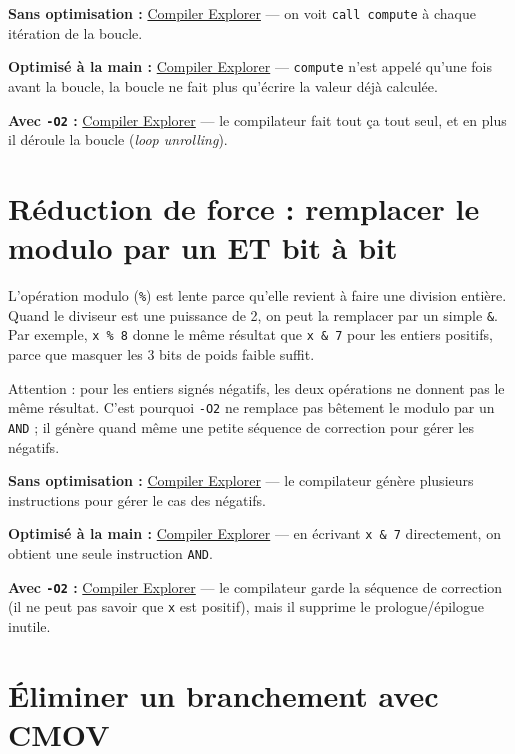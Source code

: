 \documentclass[a4paper,12pt]{article}
\begin{document}
\textbf{Sans optimisation :} \href{https://godbolt.org/z/rs34zxv66}{Compiler Explorer}
--- on voit \texttt{call compute} à chaque itération de la boucle.

\textbf{Optimisé à la main :} \href{https://godbolt.org/z/Tf6M78eEP}{Compiler Explorer}
--- \texttt{compute} n'est appelé qu'une fois avant la boucle, la boucle ne fait plus
qu'écrire la valeur déjà calculée.

\textbf{Avec \texttt{-O2} :} \href{https://godbolt.org/z/hY5G1TToE}{Compiler Explorer}
--- le compilateur fait tout ça tout seul, et en plus il déroule la boucle (\emph{loop unrolling}).

\section{Réduction de force : remplacer le modulo par un ET bit à bit}

L'opération modulo (\texttt{\%}) est lente parce qu'elle revient à faire une division entière. Quand le diviseur est une puissance de 2, on peut la remplacer par un simple \texttt{\&}. Par exemple, \texttt{x \% 8} donne le même résultat que \texttt{x \& 7} pour les entiers positifs, parce que masquer les 3 bits de poids faible suffit.

Attention : pour les entiers signés négatifs, les deux opérations ne donnent pas le même résultat. C'est pourquoi \texttt{-O2} ne remplace pas bêtement le modulo par un \texttt{AND} ; il génère quand même une petite séquence de correction pour gérer les négatifs.

\textbf{Sans optimisation :} \href{https://godbolt.org/z/vvTGvs79z}{Compiler Explorer}
--- le compilateur génère plusieurs instructions pour gérer le cas des négatifs.

\textbf{Optimisé à la main :} \href{https://godbolt.org/z/as49MTh4e}{Compiler Explorer}
--- en écrivant \texttt{x \& 7} directement, on obtient une seule instruction \texttt{AND}.

\textbf{Avec \texttt{-O2} :} \href{https://godbolt.org/z/vbaTfebov}{Compiler Explorer}
--- le compilateur garde la séquence de correction (il ne peut pas savoir que \texttt{x} est positif), mais il supprime le prologue/épilogue inutile.

\section{Éliminer un branchement avec CMOV}
\end{document}
